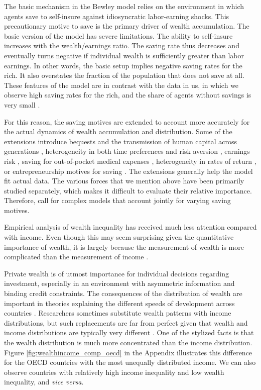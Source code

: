 \documentclass[a4paper,11pt]{article}
\begin{document}
The basic mechanism in the Bewley model relies on the environment in which agents save to self-insure against idiosyncratic labor-earning shocks. This precautionary motive to save is the primary driver of wealth accumulation. The basic version of the model has severe limitations. The ability to self-insure increases with the wealth/earnings ratio. The saving rate thus decreases and eventually turns negative if individual wealth is sufficiently greater than labor earnings. In other words, the basic setup implies negative saving rates for the rich. It also overstates the fraction of the population that does not save at all. These features of the model are in contrast with the data in \ac{us}, in which we observe high saving rates for the rich, and the share of agents without savings is very small \citep{DENARDI2017280}. 

For this reason, the saving motives are extended to account more accurately for the actual dynamics of wealth accumulation and distribution. Some of the extensions introduce bequests and the transmission of human capital across generations \citep{nardi2004wealth,de2014bequests}, heterogeneity in both time preferences and risk aversion \citep{HENDRICKS2007}, earnings risk \citep{castaneda2003}, saving for out-of-pocket medical expenses \citep{kopecky2014impact}, heterogeneity in rates of return \citep{lusardi2017optimal,BENHABIB2015489}, or entrepreneurship motives for saving \citep{cagetti2006entrepreneurship}. The extensions generally help the model fit actual data. The various forces that we mention above have been primarily studied separately, which makes it difficult to evaluate their relative importance. Therefore, \citet{DENARDI2017280} call for complex models that account jointly for varying saving motives.

Empirical analysis of wealth inequality has received much less attention compared with income. Even though this may seem surprising given the quantitative importance of wealth, it is largely because the measurement of wealth is more complicated than the measurement of income \citep{zucman2018}.

Private wealth is of utmost importance for individual  decisions regarding investment, especially in an environment with asymmetric information and binding credit constraints. The consequences of the distribution of wealth are important in theories explaining the different speeds of development across countries \citep{roine2015long}. Researchers sometimes substitute wealth patterns with income distributions, but such replacements are far from perfect given that wealth and income distributions are typically very different \citep{bagchi2015does}. One of the stylized facts is that the wealth distribution is much more concentrated than the income distribution. Figure \ref{fig:wealthincome_comp_oecd} in the Appendix illustrates this difference for the OECD countries with the most unequally distributed income. We can also observe countries with relatively high income inequality and low wealth inequality, and \textit{vice versa}.
\end{document}

